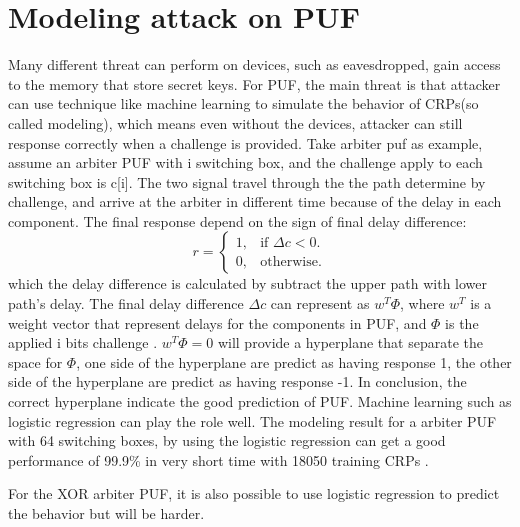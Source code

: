 \section{Modeling attack on PUF}
Many different threat can perform on devices, such as eavesdropped, gain access to the memory that store secret keys. For PUF, the main threat is that attacker can use technique 
like machine learning to simulate the behavior of CRPs(so called modeling), which means even without the devices, attacker can still response correctly when a challenge is 
provided. Take arbiter puf as example, assume an arbiter PUF with i switching box, and the challenge apply to each switching box is c[i]. The two signal travel through the 
the path determine by challenge, and arrive at the arbiter in different time because of the delay in each component. The final response depend on the sign of final delay 
difference:
\begin{equation}
    r =\begin{cases}
    1, & \text{if $\Delta c<0$}.\\
    0, & \text{otherwise}.
    \end{cases}
\end{equation}
which the delay difference is calculated by subtract the upper path with lower path's delay. The final delay difference $\Delta c$ can represent as $w^{T}\Phi$, where $w^{T}$ is 
a weight vector that represent delays for the components in PUF, and $\Phi$ is the applied i bits challenge \cite{Reference5}. $w^{T}\Phi = 0$ will provide a hyperplane that separate the space for $\Phi$, one side of the hyperplane are predict as having response 1, the other side of the hyperplane
are predict as having response -1. In conclusion, the correct hyperplane indicate the good prediction of PUF. Machine learning such as logistic regression can play the role well. The modeling result for a arbiter PUF with 64 switching boxes, 
by using the logistic regression can get a good performance of 99.9\% in very short time with 18050 training CRPs \cite{Reference6}.

For the XOR arbiter PUF, it is also possible to use logistic regression to predict the behavior but will be harder.

